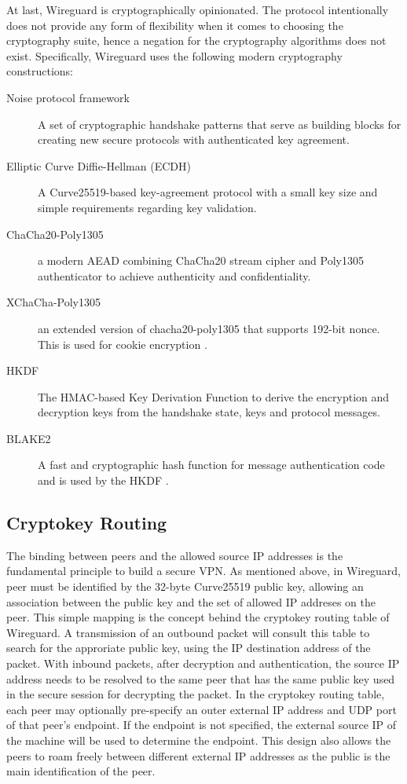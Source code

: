 At last, Wireguard is cryptographically opinionated. The protocol intentionally does not provide 
any form of flexibility when it comes to choosing the cryptography suite, hence a negation for
the cryptography algorithms does not exist. Specifically, Wireguard uses the following modern
cryptography constructions:
\begin{description}
  \item[Noise protocol framework]  A set of cryptographic handshake patterns that 
  serve as building blocks for creating new secure protocols with authenticated key agreement.
  \item[Elliptic Curve Diffie-Hellman (ECDH)] A Curve25519-based key-agreement protocol 
  with a small key size and simple requirements regarding key validation.
  \item[ChaCha20-Poly1305] a modern AEAD combining ChaCha20 \cite{chacha20} stream cipher 
  and Poly1305 \cite{poly1305} authenticator to achieve authenticity and confidentiality. 
  \item[XChaCha-Poly1305] an extended version of chacha20-poly1305 that supports 192-bit nonce.
  This is used for cookie encryption \cite{irtf-cfrg-xchacha-03}.
  \item[HKDF] The HMAC-based Key Derivation Function \cite{rfc5869} to derive the encryption
  and decryption keys from the handshake state, keys and protocol messages.
  \item[BLAKE2] A fast and cryptographic hash function for message authentication code and is used
  by the HKDF \cite{rfc7693}.

\end{description}

\subsection{Cryptokey Routing}
  The binding between peers and the allowed source IP addresses is the fundamental principle to build 
  a secure VPN. As mentioned above, in Wireguard, peer must be identified by the 32-byte
  Curve25519 public key, allowing an association between the public key and the set
  of allowed IP addreses on the peer. This simple mapping is the concept behind the cryptokey
  routing table of Wireguard. A transmission of an outbound packet will consult this table to search
  for the approriate public key, using the IP destination address of the packet. With inbound packets,
  after decryption and authentication, the source IP address needs to be resolved to the same 
  peer that has the same public key used in the secure session for decrypting the packet. 
  In the cryptokey routing table, each peer may optionally pre-specify an outer external IP address
  and UDP port of that peer's endpoint. If the endpoint is not specified, the external
  source IP of the machine will be used to determine the endpoint.
  This design also allows the peers to roam freely between different external IP addresses as the
  public is the main identification of the peer.
  

